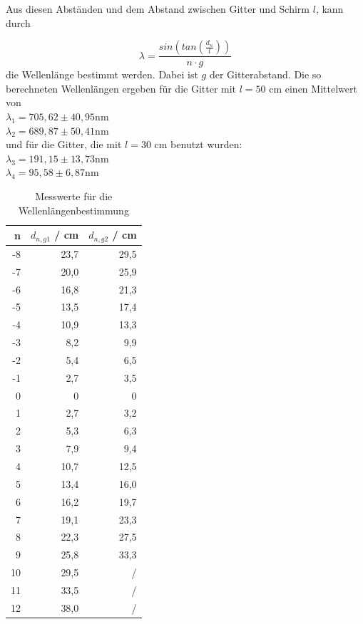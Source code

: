 Aus diesen Abständen und dem Abstand zwischen Gitter und Schirm $l$, kann durch

\begin{equation}
  \lambda = \frac{sin \left(tan \left(\frac{d_n}{l}\right)\right)}{n \cdot g}
\end{equation}
die Wellenlänge bestimmt werden. Dabei ist $g$ der Gitterabstand. 
Die so berechneten Wellenlängen ergeben für die Gitter mit $l = 50$ cm einen Mittelwert von \\
$\lambda_1 = 705,62 \pm 40,95 \si{\nano\meter}$ \\
$\lambda_2 = 689,87 \pm 50,41 \si{\nano\meter}$ \\
und für die Gitter, die mit $l = 30$ cm benutzt wurden: \\
$\lambda_3 = 191,15 \pm 13,73 \si{\nano\meter}$ \\
$\lambda_4 = 95,58 \pm 6,87 \si{\nano\meter}$ \\



\begin{table}[H]
  \centering
  \footnotesize
  \caption{Messwerte für die Wellenlängenbestimmung}
  \label{tab:wel}
  \begin{tabular}{r r r}
  \toprule
    n & $d_{n,g1}$ / cm & $d_{n,g2}$ / cm \\
  \midrule
    -8 & 23,7 & 29,5 \\
    -7 & 20,0 & 25,9 \\
    -6 & 16,8 & 21,3 \\
    -5 & 13,5 & 17,4 \\
    -4 & 10,9 & 13,3 \\
    -3 & 8,2  & 9,9 \\
    -2 & 5,4  & 6,5 \\
    -1 & 2,7  & 3,5 \\
    0  & 0    & 0   \\
    1  & 2,7  & 3,2 \\
    2  & 5,3  & 6,3 \\
    3  & 7,9  & 9,4 \\
    4  & 10,7 & 12,5 \\
    5  & 13,4 & 16,0 \\
    6  & 16,2 & 19,7 \\
    7  & 19,1 & 23,3 \\ 
    8  & 22,3 & 27,5 \\
    9  & 25,8 & 33,3 \\
    10 & 29,5 & /    \\
    11 & 33,5 & /    \\
    12 & 38,0 & /    \\
  \bottomrule
  \end{tabular}
\end{table}
